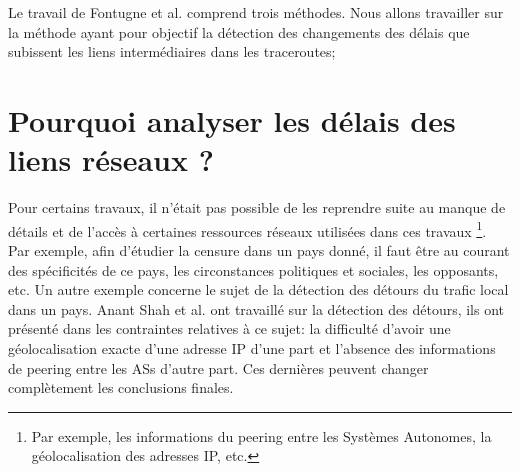 Le travail de  Fontugne et al. \cite{DBLP:journals/corr/FontugneAPB16} comprend trois méthodes. Nous allons travailler sur la méthode ayant pour objectif la détection des changements des délais que subissent les liens intermédiaires dans les traceroutes; 




\section{Pourquoi analyser les délais des liens réseaux ?}


Pour certains travaux, il n'était pas possible  de les reprendre suite au manque de détails et de l'accès à  certaines ressources réseaux utilisées dans ces travaux \footnote{Par exemple, les informations du peering entre les Systèmes Autonomes, la géolocalisation des adresses IP, etc.}. Par exemple, afin d'étudier la censure dans un pays donné, il faut être au courant des spécificités de ce pays, les circonstances politiques et sociales, les opposants,  etc.  Un autre exemple concerne le sujet de la détection des détours du trafic local dans un pays.  Anant Shah  et al. ont travaillé sur la détection des détours, ils ont présenté dans  \cite{anant-shah} les contraintes relatives à ce sujet: la difficulté d'avoir une géolocalisation exacte d'une adresse IP d'une part et l'absence des informations de peering entre les ASs d'autre part. Ces dernières peuvent changer complètement les conclusions finales. 

